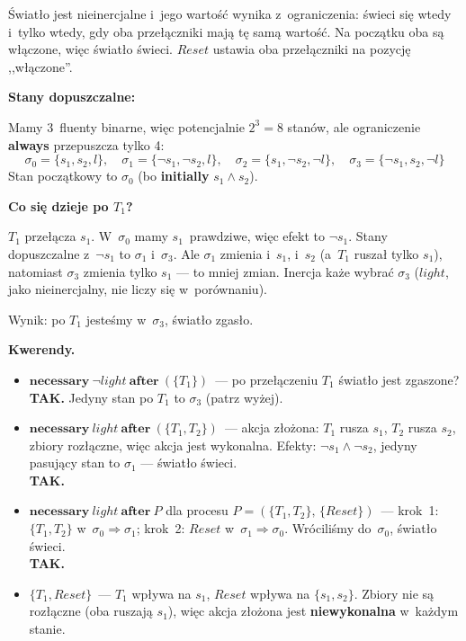 \documentclass[11pt,a4paper]{article}
\newcommand{\aft}{\textbf{after}}
\newcommand{\initially}{\textbf{initially}}
\newcommand{\always}{\textbf{always}}
\newcommand{\necessary}{\textbf{necessary}}
\begin{document}
Światło jest nieinercjalne i~jego wartość wynika z~ograniczenia: świeci się
wtedy i~tylko wtedy, gdy oba przełączniki mają tę samą wartość.
Na początku oba są włączone, więc światło świeci.
$\mathit{Reset}$ ustawia oba przełączniki na pozycję ,,włączone''.

\medskip
\noindent\textbf{Stany dopuszczalne:}

Mamy 3~fluenty binarne, więc potencjalnie $2^3 = 8$ stanów,
ale ograniczenie \always{} przepuszcza tylko 4:
\[
  \sigma_0 = \{s_1, s_2, l\}, \quad
  \sigma_1 = \{\neg s_1, \neg s_2, l\}, \quad
  \sigma_2 = \{s_1, \neg s_2, \neg l\}, \quad
  \sigma_3 = \{\neg s_1, s_2, \neg l\}
\]
Stan początkowy to $\sigma_0$ (bo \initially{} $s_1 \land s_2$).

\medskip
\noindent\textbf{Co się dzieje po $T_1$?}

$T_1$ przełącza $s_1$. W~$\sigma_0$ mamy $s_1$~prawdziwe,
więc efekt to $\neg s_1$. Stany dopuszczalne z~$\neg s_1$ to $\sigma_1$ i~$\sigma_3$.
Ale $\sigma_1$ zmienia i~$s_1$, i~$s_2$ (a~$T_1$ ruszał tylko $s_1$),
natomiast $\sigma_3$ zmienia tylko $s_1$ --- to mniej zmian.
Inercja każe wybrać $\sigma_3$ ($\mathit{light}$, jako nieinercjalny, nie liczy się w~porównaniu).

Wynik: po $T_1$ jesteśmy w~$\sigma_3$, światło zgasło.

\medskip
\noindent\textbf{Kwerendy.}

\begin{itemize}
  \item $\necessary\ \neg\mathit{light}\ \aft\ (\{T_1\})$~---
    po przełączeniu $T_1$ światło jest zgaszone?\\
    \textbf{TAK.} Jedyny stan po $T_1$ to $\sigma_3$ (patrz wyżej).

  \item $\necessary\ \mathit{light}\ \aft\ (\{T_1, T_2\})$~---
    akcja złożona: $T_1$ rusza $s_1$, $T_2$ rusza $s_2$, zbiory rozłączne,
    więc akcja jest wykonalna.
    Efekty: $\neg s_1 \land \neg s_2$, jedyny pasujący stan to $\sigma_1$ --- światło świeci.\\
    \textbf{TAK.}

  \item $\necessary\ \mathit{light}\ \aft\ P$
    dla procesu $P = (\{T_1, T_2\},\, \{\mathit{Reset}\})$~---
    krok~1: $\{T_1, T_2\}$ w~$\sigma_0 \Rightarrow \sigma_1$;
    krok~2: $\mathit{Reset}$ w~$\sigma_1 \Rightarrow \sigma_0$.
    Wróciliśmy do~$\sigma_0$, światło świeci.\\
    \textbf{TAK.}

  \item $\{T_1, \mathit{Reset}\}$~---
    $T_1$ wpływa na $s_1$, $\mathit{Reset}$ wpływa na $\{s_1, s_2\}$.
    Zbiory nie są rozłączne (oba ruszają $s_1$), więc akcja złożona jest
    \textbf{niewykonalna} w~każdym stanie.
\end{itemize}
\end{document}
